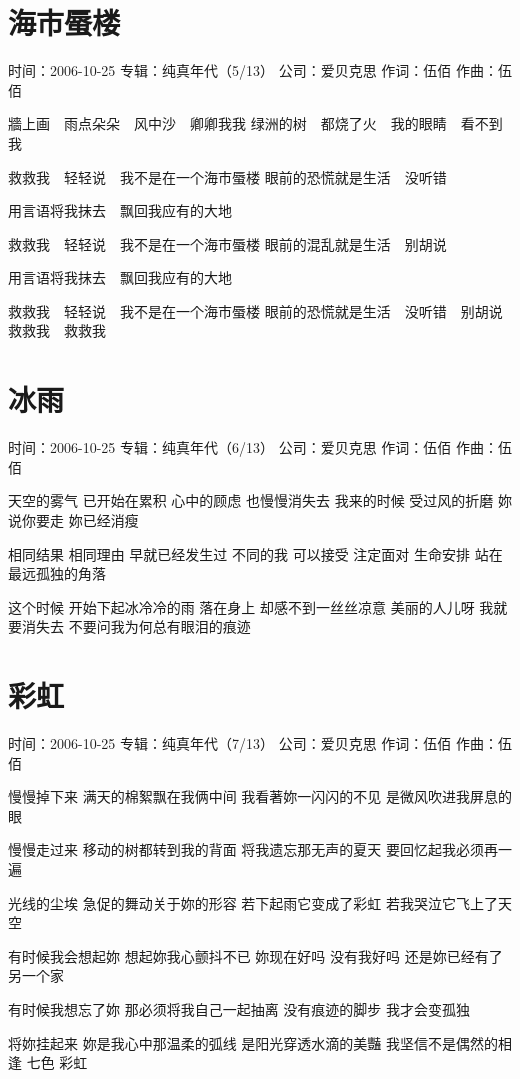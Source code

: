 \documentclass[UTF8,a4paper,oneside,twocolumn,12pt]{ctexbook}
\newcommand{\infopair}[2]{\textbullet #1：#2}
\newcommand{\zc}[1][伍佰]{\infopair{作词}{#1}}
\newcommand{\zq}[1][伍佰]{\infopair{作曲}{#1}}
\newcommand{\zj}[1]{\infopair{专辑}{#1}}
\newcommand{\sj}[1]{\infopair{时间}{#1}}
\newcommand{\gs}[1]{\infopair{公司}{#1}}
\newenvironment{info}{\begin{flushleft}\kaishu
	}
	{\end{flushleft}\normalsize\yahei\par}
\newenvironment{lyric}{
	}
{}
\begin{document}
\section{海市蜃楼}
\begin{info}
	\sj{2006-10-25}
	\zj{纯真年代（5/13）}
	\gs{爱贝克思}
	\zc
	\zq
\end{info}
\begin{lyric}
	牆上画　雨点朵朵　风中沙　卿卿我我
	绿洲的树　都烧了火　我的眼睛　看不到我

	救救我　轻轻说　我不是在一个海市蜃楼
	眼前的恐慌就是生活　没听错

	用言语将我抹去　飘回我应有的大地

	救救我　轻轻说　我不是在一个海市蜃楼
	眼前的混乱就是生活　别胡说

	用言语将我抹去　飘回我应有的大地

	救救我　轻轻说　我不是在一个海市蜃楼
	眼前的恐慌就是生活　没听错　别胡说　救救我　救救我
\end{lyric}

\section{冰雨}
\begin{info}
	\sj{2006-10-25}
	\zj{纯真年代（6/13）}
	\gs{爱贝克思}
	\zc
	\zq
\end{info}
\begin{lyric}
	天空的雾气 已开始在累积
	心中的顾虑 也慢慢消失去
	我来的时候 受过风的折磨
	妳说你要走 妳已经消瘦

	相同结果 相同理由 早就已经发生过
	不同的我 可以接受 注定面对 生命安排
	站在最远孤独的角落

	这个时候 开始下起冰冷冷的雨
	落在身上 却感不到一丝丝凉意
	美丽的人儿呀 我就要消失去
	不要问我为何总有眼泪的痕迹
\end{lyric}

\section{彩虹}
\begin{info}
	\sj{2006-10-25}
	\zj{纯真年代（7/13）}
	\gs{爱贝克思}
	\zc
	\zq
\end{info}
\begin{lyric}
	慢慢掉下来 满天的棉絮飘在我俩中间
	我看著妳一闪闪的不见 是微风吹进我屏息的眼

	慢慢走过来 移动的树都转到我的背面
	将我遗忘那无声的夏天 要回忆起我必须再一遍

	光线的尘埃 急促的舞动关于妳的形容
	若下起雨它变成了彩虹 若我哭泣它飞上了天空

	有时候我会想起妳 想起妳我心颤抖不已
	妳现在好吗 没有我好吗 还是妳已经有了另一个家

	有时候我想忘了妳 那必须将我自己一起抽离
	没有痕迹的脚步 我才会变孤独

	将妳挂起来 妳是我心中那温柔的弧线
	是阳光穿透水滴的美豔 我坚信不是偶然的相逢 七色 彩虹
\end{lyric}
\end{document}
